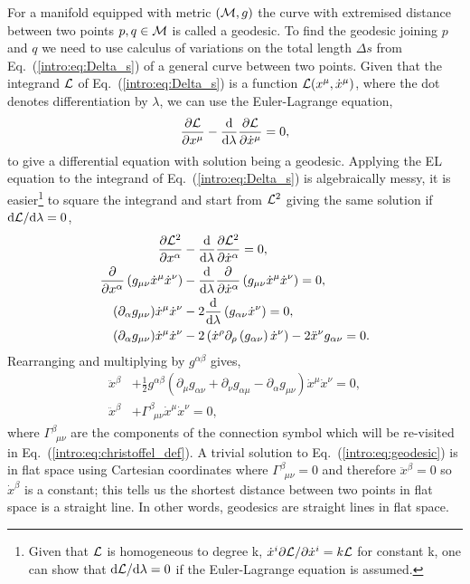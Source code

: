  For a manifold equipped with metric $(\mathcal{M},g)$ the curve with \color{orchid} extremised \color{black} distance between two points $p,q\in\mathcal{M}$ is called a geodesic. To find the geodesic joining $p$ and $q$ we need to use calculus of variations on the total length $\Delta s$ from Eq.~(\ref{intro:eq:Delta_s}) of a general curve between two points. Given that the integrand $\mathcal{L}$ of Eq.~(\ref{intro:eq:Delta_s}) is a function $\mathcal{L}(x^\mu,\dot{x}^\mu)$, where the dot denotes differentiation by $\lambda$, we can use the Euler-Lagrange equation,
\begin{align}
\frac{\partial{\mathcal{L}}}{\partial x^\mu} - \frac{\dd}{\dd \lambda}\frac{\partial \mathcal{L}}{\partial \dot{x}^\mu} = 0,
\end{align}
to give a differential equation with solution being a geodesic. Applying the EL equation to the integrand of Eq.~(\ref{intro:eq:Delta_s}) is algebraically messy, it is easier\footnote{Given that $\mathcal{L}$ is homogeneous to degree k, $\dot{x}^i \partial \mathcal{L} / \partial \dot{x}^i = k\mathcal{L}$ for constant k, one can show that $\dd\mathcal{L}/\dd\lambda=0$ if the Euler-Lagrange equation is assumed.} to square the integrand and start from $\mathcal{L}^2$ giving the same solution if $\dd \mathcal{L} / \dd \lambda=0$, 
\begin{align}
\frac{\partial{\mathcal{L}^2}}{\partial x^\alpha} &- \frac{\dd}{\dd \lambda}\frac{\partial \mathcal{L}^2}{\partial \dot{x}^\alpha} = 0, \\
\frac{\partial}{\partial x^\alpha} \left(g_{\mu\nu}\dot{x}^\mu\dot{x}^\nu\right) &- \frac{\dd}{\dd \lambda}\frac{\partial }{\partial \dot{x}^\alpha}\left(g_{\mu\nu}\dot{x}^\mu\dot{x}^\nu\right) = 0, \\
(\partial_\alpha g_{\mu\nu})\dot{x}^\mu\dot{x}^\nu &- 2\frac{\dd}{\dd \lambda}\left(g_{\alpha\nu}\dot{x}^\nu\right) = 0, \\
(\partial_\alpha g_{\mu\nu})\dot{x}^\mu\dot{x}^\nu &- 2\left(\dot{x}^\rho \partial_\rho \left(g_{\alpha\nu}\right)\dot{x}^\nu\right) - 2\ddot{x}^\nu g_{\alpha\nu} =0. 
\end{align}
Rearranging and multiplying by $g^{\alpha\beta}$ gives,
\begin{align}
\ddot{x}^\beta &+ \frac{1}{2}g^{\alpha\beta}\left(\partial_{\mu}g_{\alpha\nu} +\partial_{\nu}g_{\alpha\mu} -\partial_{\alpha}g_{\mu\nu} \right)\dot{x}^\mu\dot{x}^\nu=0,\\
 \ddot{x}^\beta &+ \Gamma^\beta_{\,\,\,\mu\nu}\dot{x}^\mu\dot{x}^\nu=0, \label{intro:eq:geodesic}
\end{align}
where $\Gamma^\beta_{\,\,\,\mu\nu}$ \color{orchid} are the components of the connection symbol which will be re-visited in Eq.~(\ref{intro:eq:christoffel_def}). \color{black} A trivial solution to Eq.~(\ref{intro:eq:geodesic}) is in flat space using Cartesian coordinates where $\Gamma^\beta_{\,\,\,\mu\nu}=0$ and therefore $\ddot{x}^\beta=0$ so $\dot{x}^\beta$ is a constant; this tells us the shortest distance between two points in flat space is a straight line. In other words, geodesics are straight lines in flat space.

